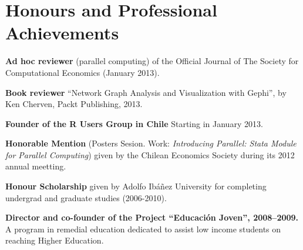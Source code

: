 \documentclass[letterpaper, 12pt]{article}
\def\footerlink{http://www.ggvega.com}
\renewenvironment{itemize}{
  \begin{list}{}{
    \setlength{\leftmargin}{0.45cm}
  }
}{
  \end{list}
}
\begin{document}
\section*{Honours and Professional Achievements}

\begin{itemize}
\item \textbf{Ad hoc reviewer} (parallel computing) of the Official Journal of The Society for Computational Economics (January 2013).
\item \textbf{Book reviewer} ``Network Graph Analysis and Visualization with Gephi'', by Ken Cherven, Packt Publishing, 2013.
\item \textbf{Founder of the R Users Group in Chile} Starting in January 2013.
\item \textbf{Honorable Mention} (Posters Sesion. Work: \emph{Introducing Parallel: Stata Module for Parallel Computing}) given by the Chilean Economics Society during its 2012 annual meetting.
\item \textbf{Honour Scholarship} given by Adolfo Ib\'a\~nez University for completing undergrad and graduate studies (2006-2010).
\item \textbf{Director and co-founder of the Project ``Educaci\'on Joven'', 2008--2009.} A program in remedial education
 dedicated to assist low income students on reaching Higher Education.
\end{itemize}


\end{document}
